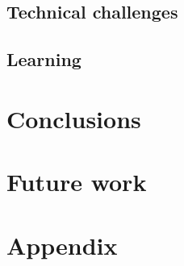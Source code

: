 \documentclass[pdftex,12pt,a4paper]{report}
\begin{document}
\subsection{Technical challenges}

\subsection{Learning}


\pagebreak

\section{Conclusions}


\pagebreak

\section{Future work}


\pagebreak

\section{Appendix}


 
\end{document}
